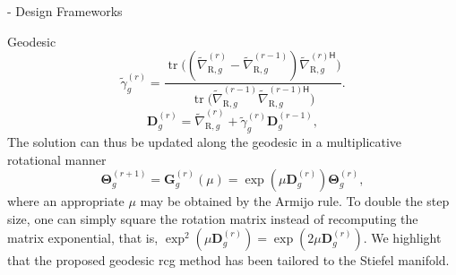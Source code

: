 \documentclass[journal]{IEEEtran}
\DeclareMathOperator{\tr}{tr}
\begin{document}
\begin{section}{- Design Frameworks}
\begin{subsection}{Geodesic }
		\begin{equation}
			\tilde{\gamma}_g^{(r)} = \frac{\tr\bigl((\tilde{\nabla}_{\mathrm{R},g}^{(r)} - \tilde{\nabla}_{\mathrm{R},g}^{(r-1)}) {\tilde{\nabla}_{\mathrm{R},g}^{(r)\mathsf{H}}}\bigr)}{\tr\bigl(\tilde{\nabla}_{\mathrm{R},g}^{(r-1)} {\tilde{\nabla}_{\mathrm{R},g}^{(r-1)\mathsf{H}}}\bigr)}. %
			\label{eq:parameter_cg_geodesic}
		\end{equation}
		\begin{equation}
			{\mathbf{D}}_g^{(r)} = \tilde{\nabla}_{\mathrm{R},g}^{(r)} + \tilde{\gamma}_g^{(r)} {\mathbf{D}}_g^{(r-1)},
			\label{eq:direction_cg_geodesic}
		\end{equation}
		The solution can thus be updated along the geodesic in a multiplicative rotational manner
		\begin{equation}
			\mathbf{\Theta}_g^{(r+1)} = \mathbf{G}_g^{(r)}(\mu) = \exp(\mu \mathbf{D}_g^{(r)}) \mathbf{\Theta}_g^{(r)},
			\label{eq:update_geodesic}
		\end{equation}
		where an appropriate $\mu$ may be obtained by the Armijo rule.
		To double the step size, one can simply square the rotation matrix instead of recomputing the matrix exponential, that is, $\exp^2(\mu \mathbf{D}_g^{(r)}) = \exp(2 \mu \mathbf{D}_g^{(r)})$.
		We highlight that the proposed geodesic \gls{rcg} method has been tailored to the Stiefel manifold.


\end{subsection}
\end{section}
\end{document}
